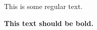 \documentclass{article}
\begin{document}


This is some regular text.

\textbf{This text should be bold.}
\end{document}
